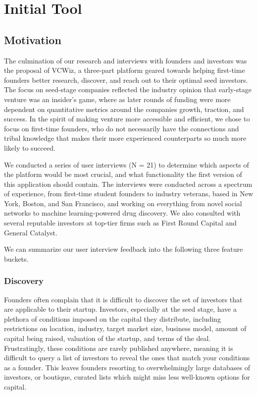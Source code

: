 \chapter{Initial Tool}
\label{ch:ch3}

\section{Motivation}

The culmination of our research and interviews with founders and investors was the proposal of VCWiz, a three-part platform geared towards helping first-time founders better research, discover, and reach out to their optimal seed investors. The focus on seed-stage companies reflected the industry opinion that early-stage venture was an insider's game, where as later rounds of funding were more dependent on quantitative metrics around the companies growth, traction, and success. In the spirit of making venture more accessible and efficient, we chose to focus on first-time founders, who do not necessarily have the connections and tribal knowledge that makes their more experienced counterparts so much more likely to succeed.

We conducted a series of user interviews (N = 21) to determine which aspects of the platform would be most crucial, and what functionality the first version of this application should contain. The interviews were conducted across a spectrum of experience, from first-time student founders to industry veterans, based in New York, Boston, and San Francisco, and working on everything from novel social networks to machine learning-powered drug discovery. We also consulted with several reputable investors at top-tier firms such as First Round Capital and General Catalyst.

We can summarize our user interview feedback into the following three feature buckets.

\subsection{Discovery}

Founders often complain that it is difficult to discover the set of investors that are applicable to their startup. Investors, especially at the seed stage, have a plethora of conditions imposed on the capital they distribute, including restrictions on location, industry, target market size, business model, amount of capital being raised, valuation of the startup, and terms of the deal. Frustratingly, these conditions are rarely published anywhere, meaning it is difficult to query a list of investors to reveal the ones that match your conditions as a founder. This leaves founders resorting to overwhelmingly large databases of investors, or boutique, curated lists which might miss less well-known options for capital.

